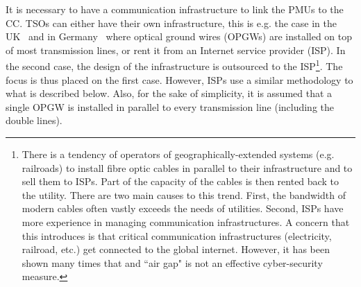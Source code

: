 It is necessary to have a communication infrastructure to link the PMUs to the CC. TSOs can either have their own infrastructure, this is e.g. the case in the UK~\cite[p110]{bookUK_OPGW} and in Germany~\cite[p42]{ThesisInspire} where optical ground wires (OPGWs) are installed on top of most transmission lines, or rent it from an Internet service provider (ISP). In the second case, the design of the infrastructure is outsourced to the ISP\footnote{There is a tendency of operators of geographically-extended systems (e.g. railroads) to install fibre optic cables in parallel to their infrastructure and to sell them to ISPs. Part of the capacity of the cables is then rented back to the utility. There are two main causes to this trend. First, the bandwidth of modern cables often vastly exceeds the needs of utilities. Second, ISPs have more experience in managing communication infrastructures. A concern that this introduces is that critical communication infrastructures (electricity, railroad, etc.) get connected to the global internet. However, it has been shown many times that and ``air gap" is not an effective cyber-security measure.}. The focus is thus placed on the first case. However, ISPs use a similar methodology to what is described below. Also, for the sake of simplicity, it is assumed that a single OPGW is installed in parallel to every transmission line (including the double lines).

